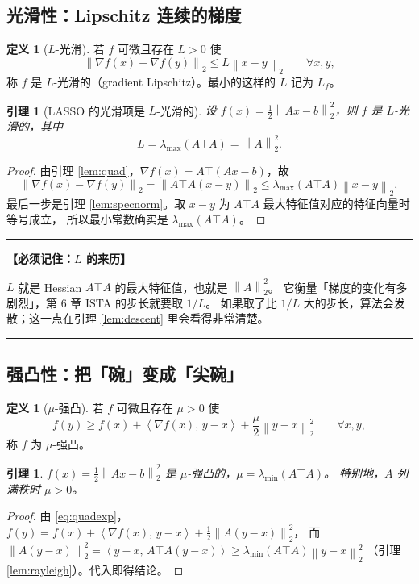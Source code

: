 \documentclass[11pt,a4paper,UTF8]{ctexart}
\theoremstyle{plain}
\newtheorem{lemma}[theorem]{引理}
\theoremstyle{definition}
\newtheorem{definition}[theorem]{定义}
\theoremstyle{remark}
\newcommand{\norm}[1]{\left\lVert #1 \right\rVert}
\newcommand{\inner}[2]{\left\langle #1,\, #2 \right\rangle}
\newenvironment{keypoint}[1]
  {\par\medskip\noindent\begin{minipage}{\linewidth}%
   \hrule\smallskip\noindent\textbf{【必须记住：#1】}\par\nopagebreak\smallskip}
  {\smallskip\hrule\end{minipage}\medskip}
\begin{document}
\subsection{光滑性：Lipschitz 连续的梯度}

\begin{definition}[$L$-光滑]\label{def:smooth}
若 $f$ 可微且存在 $L>0$ 使
\[
\norm{\nabla f(x)-\nabla f(y)}_2\le L\norm{x-y}_2\qquad\forall x,y,
\]
称 $f$ 是 $L$-光滑的（gradient Lipschitz）。最小的这样的 $L$ 记为 $L_f$。
\end{definition}

\begin{lemma}[LASSO 的光滑项是 $L$-光滑的]\label{lem:lipschitz}
设 $f(x)=\tfrac12\norm{Ax-b}_2^2$，则 $f$ 是 $L$-光滑的，其中
\[
L=\lambda_{\max}(A\top A)=\norm{A}_2^2 .
\]
\end{lemma}

\begin{proof}
由引理 \ref{lem:quad}，$\nabla f(x)=A\top(Ax-b)$，故
\[
\norm{\nabla f(x)-\nabla f(y)}_2=\norm{A\top A(x-y)}_2\le\lambda_{\max}(A\top A)\norm{x-y}_2 ,
\]
最后一步是引理 \ref{lem:specnorm}。取 $x-y$ 为 $A\top A$ 最大特征值对应的特征向量时等号成立，
所以最小常数确实是 $\lambda_{\max}(A\top A)$。
\end{proof}

\begin{keypoint}{$L$ 的来历}
$L$ 就是 Hessian $A\top A$ 的最大特征值，也就是 $\norm{A}_2^2$。
它衡量「梯度的变化有多剧烈」，第 6 章 ISTA 的步长就要取 $1/L$。
如果取了比 $1/L$ 大的步长，算法会发散；这一点在引理 \ref{lem:descent} 里会看得非常清楚。
\end{keypoint}

\subsection{强凸性：把「碗」变成「尖碗」}

\begin{definition}[$\mu$-强凸]\label{def:strongcvx}
若 $f$ 可微且存在 $\mu>0$ 使
\[
f(y)\ge f(x)+\inner{\nabla f(x)}{y-x}+\frac{\mu}{2}\norm{y-x}_2^2\qquad\forall x,y,
\]
称 $f$ 为 $\mu$-强凸。
\end{definition}

\begin{lemma}\label{lem:strongquad}
$f(x)=\tfrac12\norm{Ax-b}_2^2$ 是 $\mu$-强凸的，$\mu=\lambda_{\min}(A\top A)$。
特别地，$A$ 列满秩时 $\mu>0$。
\end{lemma}

\begin{proof}
由 \eqref{eq:quadexp}，
$f(y)=f(x)+\inner{\nabla f(x)}{y-x}+\tfrac12\norm{A(y-x)}_2^2$，
而 $\norm{A(y-x)}_2^2=\inner{y-x}{A\top A(y-x)}\ge\lambda_{\min}(A\top A)\norm{y-x}_2^2$
（引理 \ref{lem:rayleigh}）。代入即得结论。
\end{proof}
\end{document}
